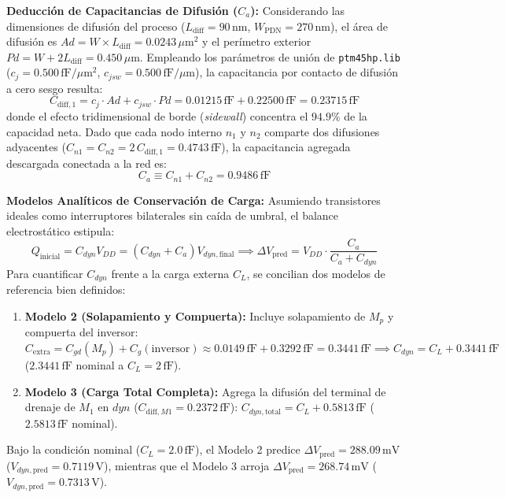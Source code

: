 \noindent\textbf{Deducción de Capacitancias de Difusión ($C_a$):} Considerando las dimensiones de difusión del proceso ($L_{\text{diff}} = 90\,\text{nm}$, $W_{\text{PDN}} = 270\,\text{nm}$), el área de difusión es $Ad = W \times L_{\text{diff}} = 0.0243\,\mu\text{m}^2$ y el perímetro exterior $Pd = W + 2L_{\text{diff}} = 0.450\,\mu\text{m}$. Empleando los parámetros de unión de \texttt{ptm45hp.lib} ($c_j = 0.500\,\text{fF}/\mu\text{m}^2$, $c_{jsw} = 0.500\,\text{fF}/\mu\text{m}$), la capacitancia por contacto de difusión a cero sesgo resulta:
\begin{equation}
  C_{\text{diff},1} = c_j \cdot Ad + c_{jsw} \cdot Pd = 0.01215\,\text{fF} + 0.22500\,\text{fF} = 0.23715\,\text{fF}
\end{equation}
donde el efecto tridimensional de borde (\textit{sidewall}) concentra el $94.9\%$ de la capacidad neta. Dado que cada nodo interno $n_1$ y $n_2$ comparte dos difusiones adyacentes ($C_{n1} = C_{n2} = 2\,C_{\text{diff},1} = 0.4743\,\text{fF}$), la capacitancia agregada descargada conectada a la red es:
\begin{equation}
  C_a \equiv C_{n1} + C_{n2} = 0.9486\,\text{fF}
\end{equation}

\noindent\textbf{Modelos Analíticos de Conservación de Carga:} Asumiendo transistores ideales como interruptores bilaterales sin caída de umbral, el balance electrostático estipula:
\begin{equation}
  Q_{\text{inicial}} = C_{dyn} V_{DD} = (C_{dyn} + C_a) V_{dyn,\text{final}} \implies \Delta V_{\text{pred}} = V_{DD} \cdot \frac{C_a}{C_a + C_{dyn}}
  \label{eq:charge_sharing}
\end{equation}
Para cuantificar $C_{dyn}$ frente a la carga externa $C_L$, se concilian dos modelos de referencia bien definidos:
\begin{enumerate}[leftmargin=1.4em,itemsep=0.12em]
  \item \textbf{Modelo 2 (Solapamiento y Compuerta):} Incluye solapamiento de $M_p$ y compuerta del inversor: $C_{\text{extra}} = C_{gd}(M_p) + C_g(\text{inversor}) \approx 0.0149\,\text{fF} + 0.3292\,\text{fF} = 0.3441\,\text{fF} \implies C_{dyn} = C_L + 0.3441\,\text{fF}$ ($2.3441\,\text{fF}$ nominal a $C_L=2\,\text{fF}$).
  \item \textbf{Modelo 3 (Carga Total Completa):} Agrega la difusión del terminal de drenaje de $M_1$ en $dyn$ ($C_{\text{diff},M1} = 0.2372\,\text{fF}$): $C_{dyn,\text{total}} = C_L + 0.5813\,\text{fF}$ ($2.5813\,\text{fF}$ nominal).
\end{enumerate}
Bajo la condición nominal ($C_L = 2.0\,\text{fF}$), el Modelo 2 predice $\Delta V_{\text{pred}} = 288.09\,\text{mV}$ ($V_{dyn,\text{pred}} = 0.7119\,\text{V}$), mientras que el Modelo 3 arroja $\Delta V_{\text{pred}} = 268.74\,\text{mV}$ ($V_{dyn,\text{pred}} = 0.7313\,\text{V}$).

